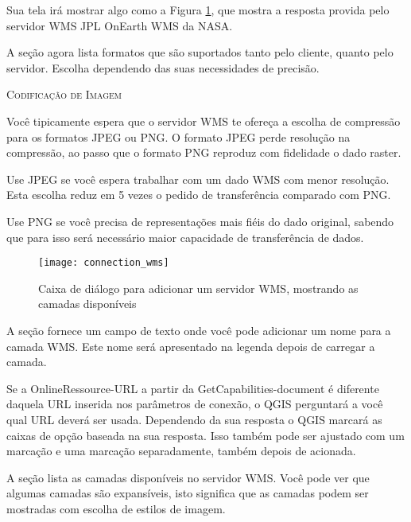 Sua tela irá mostrar algo como a Figura \ref{fig:connection_wms}, que mostra a resposta provida pelo servidor WMS JPL OnEarth WMS da NASA.


A seção  agora lista formatos que são suportados tanto pelo cliente, quanto pelo servidor. Escolha dependendo das suas necessidades de precisão.

\begin{Tip}[ht]\caption{\textsc{Codificação de Imagem}}
Você tipicamente espera que o servidor WMS te ofereça a escolha de compressão para os formatos JPEG ou PNG. O formato JPEG perde resolução na compressão, ao passo que o formato PNG reproduz com fidelidade o dado raster.

Use JPEG se você espera trabalhar com um dado WMS com menor resolução. Esta escolha reduz em 5 vezes o pedido de transferência comparado com PNG.

Use PNG se você precisa de representações mais fiéis do dado original, sabendo que para isso será necessário maior capacidade de transferência de dados. 
\end{Tip}

\begin{figure}[ht]
\centering
\texttt{[image: connection\_wms]}
\caption{Caixa de diálogo para adicionar um servidor WMS, mostrando as camadas disponíveis \nixcaption}\label{fig:connection_wms}
\end{figure}


A seção fornece um campo de texto onde você pode adicionar um nome para a camada WMS. Este nome será apresentado na legenda depois de carregar a camada.

Se a OnlineRessource-URL a partir da GetCapabilities-document é diferente daquela URL inserida nos parâmetros de conexão, o QGIS perguntará a você qual URL deverá ser usada. Dependendo da sua resposta o QGIS marcará as caixas de opção baseada na sua resposta. Isso também pode ser ajustado com um  marcação e uma  marcação separadamente, também depois de acionada.

 \label{ogc-wms-layers}

A seção  lista as camadas disponíveis no servidor WMS. Você pode ver que algumas camadas são expansíveis, isto significa que as camadas podem ser mostradas com escolha de estilos de imagem.


